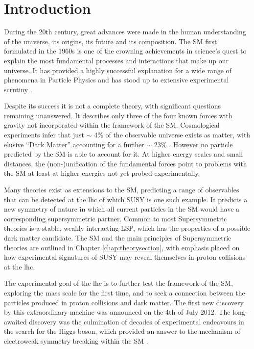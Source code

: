 \chapter{Introduction}
\label{chap:introduction}

During the 20th century, great advances were made in the human understanding of the universe, its origins, its future and its composition. The \acf{SM} first formulated in the 1960s is one of the crowning achievements in science's quest to explain the most fundamental processes and interactions that make up our universe. It has provided a highly successful explanation for a wide range of phenomena in Particle Physics and has stood up to extensive experimental scrutiny \cite{pdg2012}.

Despite its success it is not  a complete theory, with significant questions remaining unanswered. It describes only three of the four known forces with gravity not incorporated within the framework of the \ac{SM}. Cosmological experiments infer that just $\sim$ 4$\%$ of the observable universe exists as matter, with elusive ``Dark Matter'' accounting for a further $\sim$ 23$\%$ \cite{0067-0049-208-2-19}. However no particle predicted by the \ac{SM} is able to account for it.  At higher energy scales and small distances, the (non-)unification of the fundamental forces point to problems with the \ac{SM} at least at higher energies not yet probed experimentally. 

Many theories exist as extensions to the \ac{SM}, predicting a range of observables that can be detected at the \acf{lhc} of which \acf{SUSY} is one such example. It predicts a new symmetry of nature in which all current particles in the \ac{SM} would have a corresponding supersymmetric partner. Common to most Supersymmetric theories is a stable, weakly interacting \acf{LSP}, which has the properties of a possible dark matter candidate. The \ac{SM} and the main principles of Supersymmetric theories are outlined in Chapter \ref{chap:theorysection}, with emphasis placed on how experimental signatures of \ac{SUSY} may reveal themselves in proton collisions at the \ac{lhc}.

The experimental goal of the \ac{lhc} is to further test the framework of the \ac{SM}, exploring the \TeV mass scale for the first time, and to seek a connection between the particles produced in proton collisions and dark matter. The first new discovery by this extraordinary machine was announced on the 4th of July 2012. The long-awaited discovery was the culmination of decades of experimental endeavours in the search for the Higgs boson, which provided an answer to the mechanism of electroweak symmetry breaking within the \ac{SM} \cite{Aad:2012tfa}\cite{Chatrchyan:2012ufa}. 

